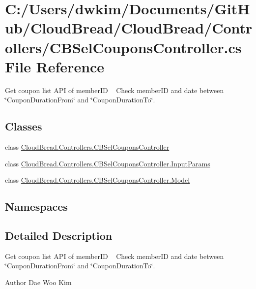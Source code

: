 \hypertarget{a00216}{}\section{C\+:/\+Users/dwkim/\+Documents/\+Git\+Hub/\+Cloud\+Bread/\+Cloud\+Bread/\+Controllers/\+C\+B\+Sel\+Coupons\+Controller.cs File Reference}
\label{a00216}


Get coupon list A\+PI of member\+ID ~\newline
Check member\+ID and date between \char`\"{}\+Coupon\+Duration\+From\char`\"{} and \char`\"{}\+Coupon\+Duration\+To\char`\"{}.  


\subsection*{Classes}
\begin{DoxyCompactItemize}
\item 
class \hyperlink{a00045}{Cloud\+Bread.\+Controllers.\+C\+B\+Sel\+Coupons\+Controller}
\item 
class \hyperlink{a00120}{Cloud\+Bread.\+Controllers.\+C\+B\+Sel\+Coupons\+Controller.\+Input\+Params}
\item 
class \hyperlink{a00162}{Cloud\+Bread.\+Controllers.\+C\+B\+Sel\+Coupons\+Controller.\+Model}
\end{DoxyCompactItemize}
\subsection*{Namespaces}
\begin{DoxyCompactItemize}
\end{DoxyCompactItemize}


\subsection{Detailed Description}
Get coupon list A\+PI of member\+ID ~\newline
Check member\+ID and date between \char`\"{}\+Coupon\+Duration\+From\char`\"{} and \char`\"{}\+Coupon\+Duration\+To\char`\"{}. 

\begin{DoxyAuthor}{Author}
Dae Woo Kim 
\end{DoxyAuthor}

